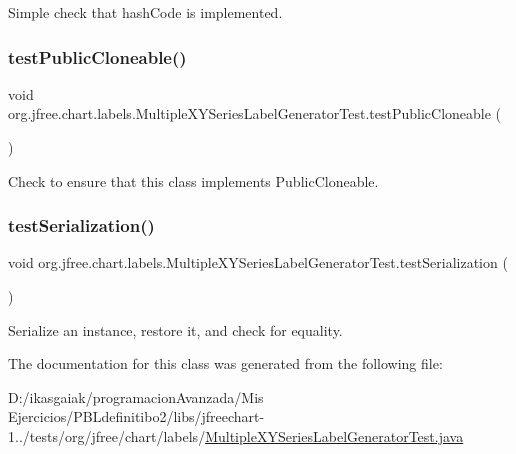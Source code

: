 Simple check that hash\+Code is implemented. \mbox{\label{classorg_1_1jfree_1_1chart_1_1labels_1_1_multiple_x_y_series_label_generator_test_a5ccc9e1a58818caed9c2be77e9769afa}} 
\subsubsection{\texorpdfstring{test\+Public\+Cloneable()}{testPublicCloneable()}}
{\footnotesize\ttfamily void org.\+jfree.\+chart.\+labels.\+Multiple\+X\+Y\+Series\+Label\+Generator\+Test.\+test\+Public\+Cloneable (\begin{DoxyParamCaption}{ }\end{DoxyParamCaption})}

Check to ensure that this class implements Public\+Cloneable. \mbox{\label{classorg_1_1jfree_1_1chart_1_1labels_1_1_multiple_x_y_series_label_generator_test_a033c772aedb22901ddab2daafb278d02}} 
\subsubsection{\texorpdfstring{test\+Serialization()}{testSerialization()}}
{\footnotesize\ttfamily void org.\+jfree.\+chart.\+labels.\+Multiple\+X\+Y\+Series\+Label\+Generator\+Test.\+test\+Serialization (\begin{DoxyParamCaption}{ }\end{DoxyParamCaption})}

Serialize an instance, restore it, and check for equality. 

The documentation for this class was generated from the following file\+:\begin{DoxyCompactItemize}
\item 
D\+:/ikasgaiak/programacion\+Avanzada/\+Mis Ejercicios/\+P\+B\+Ldefinitibo2/libs/jfreechart-\/1../tests/org/jfree/chart/labels/\mbox{\hyperlink{_multiple_x_y_series_label_generator_test_8java}{Multiple\+X\+Y\+Series\+Label\+Generator\+Test.\+java}}\end{DoxyCompactItemize}
